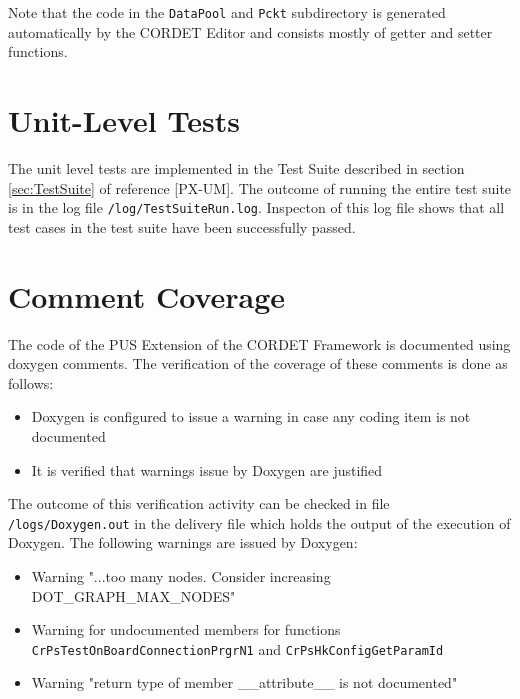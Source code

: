 \documentclass{pnp_article}
\begin{document}
Note that the code in the \texttt{DataPool} and \texttt{Pckt} subdirectory is generated automatically by the CORDET Editor and consists mostly of getter and setter functions.


\begin{landscape}
\end{landscape}




\section{Unit-Level Tests}\label{sec:svrUnitLeveTests}
The unit level tests are implemented in the Test Suite described in section \ref{sec:TestSuite} of reference [PX-UM]. The outcome of running the entire test suite is in the log file \texttt{/log/TestSuiteRun.log}. Inspecton of this log file shows that all test cases in the test suite have been successfully passed.


\section{Comment Coverage}\label{sec:svrCommCov}
The code of the PUS Extension of the CORDET Framework is documented using doxygen comments. The verification of the coverage of these comments is done as follows:

\begin{itemize}
\item Doxygen is configured to issue a warning in case any coding item is not documented
\item It is verified that warnings issue by Doxygen are justified
\end{itemize}

The outcome of this verification activity can be checked in file \texttt{/logs/Doxygen.out} in the delivery file which holds the output of the execution of Doxygen. The following warnings are issued by Doxygen:

\begin{itemize}
\item Warning "...too many nodes. Consider increasing DOT_GRAPH_MAX_NODES"
\item Warning for undocumented members for functions \texttt{CrPsTestOnBoardConnectionPrgrN1} and \texttt{CrPsHkConfigGetParamId}
\item Warning "return type of member __attribute__ is not documented"
\end{itemize}
\end{document}
